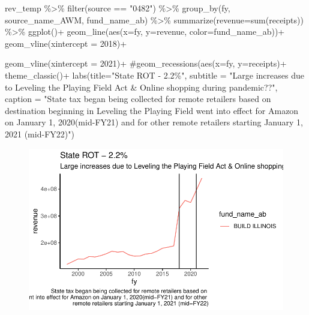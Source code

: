 \documentclass[
  letterpaper,
  DIV=11,
  numbers=noendperiod]{scrreport}
\newenvironment{Shaded}{\begin{snugshade}}{\end{snugshade}}
\newcommand{\AttributeTok}[1]{\textcolor[rgb]{0.40,0.45,0.13}{#1}}
\newcommand{\CommentTok}[1]{\textcolor[rgb]{0.37,0.37,0.37}{#1}}
\newcommand{\DecValTok}[1]{\textcolor[rgb]{0.68,0.00,0.00}{#1}}
\newcommand{\FunctionTok}[1]{\textcolor[rgb]{0.28,0.35,0.67}{#1}}
\newcommand{\NormalTok}[1]{\textcolor[rgb]{0.00,0.23,0.31}{#1}}
\newcommand{\SpecialCharTok}[1]{\textcolor[rgb]{0.37,0.37,0.37}{#1}}
\newcommand{\StringTok}[1]{\textcolor[rgb]{0.13,0.47,0.30}{#1}}
\begin{document}
\begin{Shaded}
\begin{Highlighting}[]
\NormalTok{rev\_temp }\SpecialCharTok{\%\textgreater{}\%} 
  \FunctionTok{filter}\NormalTok{(source }\SpecialCharTok{==} \StringTok{"0482"}\NormalTok{) }\SpecialCharTok{\%\textgreater{}\%}
  \FunctionTok{group\_by}\NormalTok{(fy, source\_name\_AWM, fund\_name\_ab) }\SpecialCharTok{\%\textgreater{}\%} 
  \FunctionTok{summarize}\NormalTok{(}\AttributeTok{revenue=}\FunctionTok{sum}\NormalTok{(receipts))  }\SpecialCharTok{\%\textgreater{}\%} 
  \FunctionTok{ggplot}\NormalTok{()}\SpecialCharTok{+}
  \FunctionTok{geom\_line}\NormalTok{(}\FunctionTok{aes}\NormalTok{(}\AttributeTok{x=}\NormalTok{fy, }\AttributeTok{y=}\NormalTok{revenue, }\AttributeTok{color=}\NormalTok{fund\_name\_ab))}\SpecialCharTok{+}
    \FunctionTok{geom\_vline}\NormalTok{(}\AttributeTok{xintercept =} \DecValTok{2018}\NormalTok{)}\SpecialCharTok{+}

  \FunctionTok{geom\_vline}\NormalTok{(}\AttributeTok{xintercept =} \DecValTok{2021}\NormalTok{)}\SpecialCharTok{+}
  \CommentTok{\#geom\_recessions(aes(x=fy, y=receipts)+}
  \FunctionTok{theme\_classic}\NormalTok{()}\SpecialCharTok{+}
  \FunctionTok{labs}\NormalTok{(}\AttributeTok{title=}\StringTok{"State ROT {-} 2.2\%"}\NormalTok{,}
       \AttributeTok{subtitle =} \StringTok{"Large increases due to Leveling the Playing Field Act \& Online shopping during pandemic??"}\NormalTok{,}
       \AttributeTok{caption =} \StringTok{"State tax began being collected for remote retailers based on }
\StringTok{       destination beginning in Leveling the Playing Field went into effect for Amazon on January 1, 2020(mid{-}FY21) and for other }
\StringTok{       remote retailers starting January 1, 2021 (mid{-}FY22)"}\NormalTok{)}
\end{Highlighting}
\end{Shaded}

\begin{figure}[H]

{\centering \includegraphics{./Everything_files/figure-pdf/unnamed-chunk-13-3.pdf}

}

\end{figure}
\end{document}
